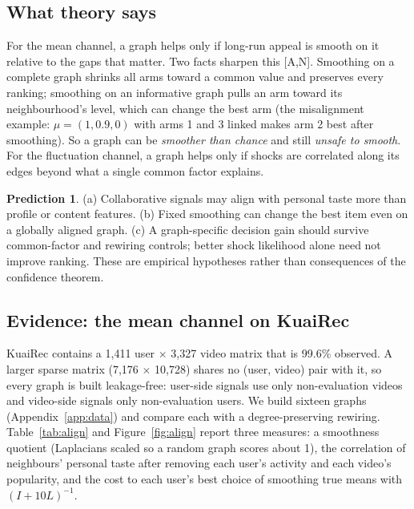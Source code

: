 \documentclass[11pt]{article}
\theoremstyle{definition}
\newtheorem{prediction}{Prediction}
\theoremstyle{remark}
\newcommand{\src}[1]{\textsf{[#1]}}
\begin{document}
\subsection{What theory says}

For the mean channel, a graph helps only if long-run appeal is smooth on it relative to the gaps that matter. Two facts sharpen this \src{A,N}. Smoothing on a complete graph shrinks all arms toward a common value and preserves every ranking; smoothing on an informative graph pulls an arm toward its neighbourhood's level, which can change the best arm (the misalignment example: $\mu=(1,0.9,0)$ with arms 1 and 3 linked makes arm 2 best after smoothing). So a graph can be \emph{smoother than chance} and still \emph{unsafe to smooth}. For the fluctuation channel, a graph helps only if shocks are correlated along its edges beyond what a single common factor explains.

\begin{prediction}\label{pred:q1}
(a) Collaborative signals may align with personal taste more than profile or content features. (b) Fixed smoothing can change the best item even on a globally aligned graph. (c) A graph-specific decision gain should survive common-factor and rewiring controls; better shock likelihood alone need not improve ranking. These are empirical hypotheses rather than consequences of the confidence theorem.
\end{prediction}

\subsection{Evidence: the mean channel on KuaiRec}

KuaiRec contains a 1,411 user $\times$ 3,327 video matrix that is 99.6\% observed. A larger sparse matrix (7,176 $\times$ 10,728) shares no (user, video) pair with it, so every graph is built leakage-free: user-side signals use only non-evaluation videos and video-side signals only non-evaluation users. We build sixteen graphs (Appendix~\ref{app:data}) and compare each with a degree-preserving rewiring. Table~\ref{tab:align} and Figure~\ref{fig:align} report three measures: a smoothness quotient (Laplacians scaled so a random graph scores about 1), the correlation of neighbours' personal taste after removing each user's activity and each video's popularity, and the cost to each user's best choice of smoothing true means with $(I+10L)^{-1}$.
\end{document}
